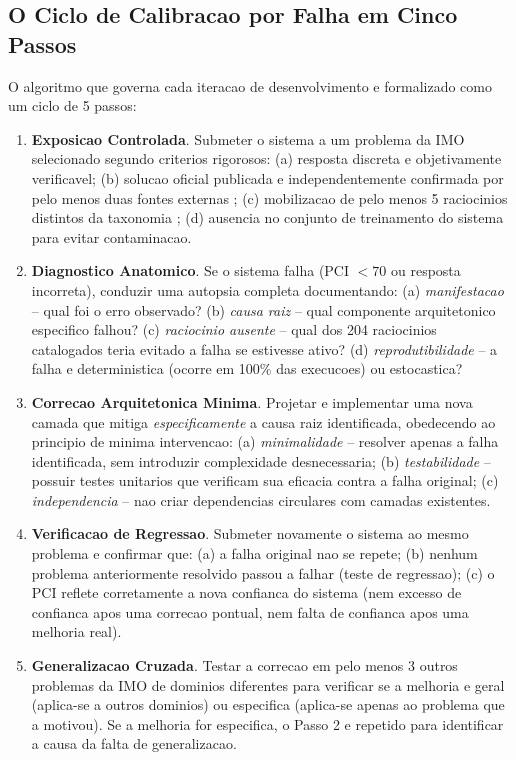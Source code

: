 \documentclass[5p]{elsarticle}
\begin{document}
\subsection{O Ciclo de Calibracao por Falha em Cinco Passos}

O algoritmo que governa cada iteracao de desenvolvimento e formalizado
como um ciclo de 5 passos:

\begin{enumerate}[label=\textbf{Passo \arabic*}:,leftmargin=*]

 \item \textbf{Exposicao Controlada}. Submeter o sistema a um problema da IMO
 selecionado segundo criterios rigorosos: (a) resposta discreta e objetivamente
 verificavel; (b) solucao oficial publicada e independentemente confirmada por
 pelo menos duas fontes externas \cite{chen2025,deepmind2025}; (c) mobilizacao
 de pelo menos 5 raciocinios distintos da taxonomia \cite{polya1945};
 (d) ausencia no conjunto de treinamento do sistema para evitar contaminacao.

 \item \textbf{Diagnostico Anatomico}. Se o sistema falha (PCI $< 70$ ou resposta
 incorreta), conduzir uma autopsia completa documentando: (a) \textit{manifestacao}
 -- qual foi o erro observado? (b) \textit{causa raiz} -- qual componente
 arquitetonico especifico falhou? (c) \textit{raciocinio ausente} -- qual dos
 204 raciocinios catalogados teria evitado a falha se estivesse ativo?
 (d) \textit{reprodutibilidade} -- a falha e deterministica (ocorre em 100\%
 das execucoes) ou estocastica?

 \item \textbf{Correcao Arquitetonica Minima}. Projetar e implementar uma nova
 camada que mitiga \textit{especificamente} a causa raiz identificada,
 obedecendo ao principio de minima intervencao: (a) \textit{minimalidade} --
 resolver apenas a falha identificada, sem introduzir complexidade
 desnecessaria; (b) \textit{testabilidade} -- possuir testes unitarios que
 verificam sua eficacia contra a falha original; (c) \textit{independencia} --
 nao criar dependencias circulares com camadas existentes.

 \item \textbf{Verificacao de Regressao}. Submeter novamente o sistema ao mesmo
 problema e confirmar que: (a) a falha original nao se repete; (b) nenhum
 problema anteriormente resolvido passou a falhar (teste de regressao);
 (c) o PCI reflete corretamente a nova confianca do sistema (nem excesso
 de confianca apos uma correcao pontual, nem falta de confianca apos uma
 melhoria real).

 \item \textbf{Generalizacao Cruzada}. Testar a correcao em pelo menos 3 outros
 problemas da IMO de dominios diferentes para verificar se a melhoria e geral
 (aplica-se a outros dominios) ou especifica (aplica-se apenas ao problema que
 a motivou). Se a melhoria for especifica, o Passo 2 e repetido para identificar
 a causa da falta de generalizacao.

\end{enumerate}
\end{document}
